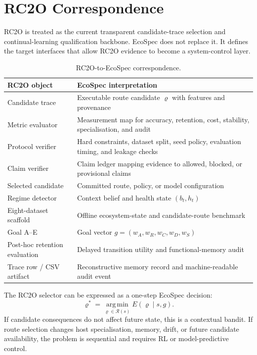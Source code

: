 \documentclass[10pt]{article}
\newcommand{\Rset}{\mathcal{R}}
\newcommand{\argmin}{\operatorname*{arg\,min}}
\begin{document}
\section{RC2O Correspondence}

RC2O is treated as the current transparent candidate-trace selection and continual-learning qualification backbone. EcoSpec does not replace it. It defines the target interfaces that allow RC2O evidence to become a system-control layer.

\begin{table}[h]
\centering
\caption{RC2O-to-EcoSpec correspondence.}
\label{tab:rc2o}
\begin{tabularx}{\textwidth}{p{}X}
\toprule
RC2O object & EcoSpec interpretation \\
\midrule
Candidate trace & Executable route candidate $\varrho$ with features and provenance \\
Metric evaluator & Measurement map for accuracy, retention, cost, stability, specialisation, and audit \\
Protocol verifier & Hard constraints, dataset split, seed policy, evaluation timing, and leakage checks \\
Claim verifier & Claim ledger mapping evidence to allowed, blocked, or provisional claims \\
Selected candidate & Committed route, policy, or model configuration \\
Regime detector & Context belief and health state $(b_t,h_t)$ \\
Eight-dataset scaffold & Offline ecosystem-state and candidate-route benchmark \\
Goal A--E & Goal vector $g=(w_A,w_R,w_C,w_D,w_S)$ \\
Post-hoc retention evaluation & Delayed transition utility and functional-memory audit \\
Trace row / CSV artifact & Reconstructive memory record and machine-readable audit event \\
\bottomrule
\end{tabularx}
\end{table}

The RC2O selector can be expressed as a one-step EcoSpec decision:
\begin{equation}
  \varrho^*=\argmin_{\varrho\in\Rset(s)}E(\varrho\mid s,g).
  \label{eq:rc2oselector}
\end{equation}
If candidate consequences do not affect future state, this is a contextual bandit. If route selection changes host specialisation, memory, drift, or future candidate availability, the problem is sequential and requires RL or model-predictive control.
\end{document}
